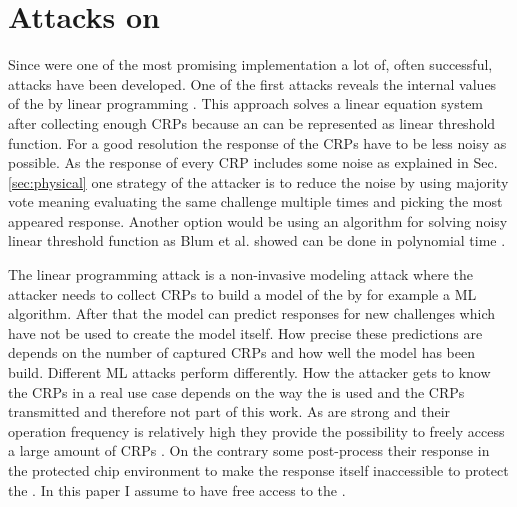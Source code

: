 
\section{Attacks on \apufs}
\label{sec:attacksonarbiter}

Since \apufs were one of the most promising \puf implementation a lot of, often successful, attacks have been developed.
One of the first attacks reveals the internal values of the \apuf by linear programming \cite{Ozturk2008TowardsDevices}.
This approach solves a linear equation system after collecting enough \acp{CRP} because an \apuf can be represented as linear threshold function.
For a good resolution the response of the \acp{CRP} have to be less noisy as possible.
As the response of every \ac{CRP} includes some noise as explained in Sec. \ref{sec:physical} one strategy of the attacker is to reduce the noise by using majority vote meaning evaluating the same challenge multiple times and picking the most appeared response.
Another option would be using an algorithm for solving noisy linear threshold function as Blum et al. showed can be done in polynomial time \cite{Blum1998AlgorithmicaNoisy}.

The linear programming attack is a non-invasive modeling attack where the attacker needs to collect \acp{CRP} to build a model of the \puf by for example a \ac{ML} algorithm.
After that the model can predict responses for new challenges which have not be used to create the model itself.
How precise these predictions are depends on the number of captured \acp{CRP} and how well the model has been build.
Different \ac{ML} attacks perform differently.
How the attacker gets to know the \acp{CRP} in a real use case depends on the way the \puf is used and the \acp{CRP} transmitted and therefore not part of this work.
As \apufs are strong \pufs and their operation frequency is relatively high they provide the possibility to freely access a large amount of \acp{CRP} \cite{Ruhrmair2010ModelingFunctions}.
On the contrary some \pufs post-process their response in the protected chip environment to make the \puf response itself inaccessible to protect the \puf \cite{Suh2007PhysicalGeneration} \cite{Gassend2004IdentificationCircuits}.
In this paper I assume to have free access to the \puf.

